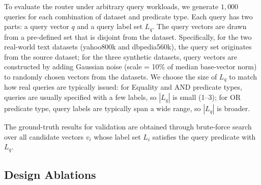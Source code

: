 To evaluate the router under arbitrary query workloads, we generate $1{,}000$ queries for each combination of dataset and predicate type. 
Each query has two parts: a query vector $q$ and a query label set $L_q$. The query vectors are drawn from a pre-defined set that is disjoint from the dataset. 
Specifically, for the two real-world text datasets (yahoo800k and dbpedia560k), the query set originates from the source dataset; for the three synthetic datasets, query vectors are constructed by adding Gaussian noise (scale = 10\% of median base-vector norm) to randomly chosen vectors from the datasets.
We choose the size of $L_q$ to match how real queries are typically issued: for Equality and AND predicate types, queries are usually specified with a few labels, so $|L_q|$ is small (1--3); for OR predicate type, query labels are typically span a wide range, so $|L_q|$ is broader.

The ground-truth results for validation
are obtained through brute-force search over all candidate vectors $v_i$ whose label set $L_i$ satisfies the query predicate with $L_q$.


\subsection{Design Ablations}
\label{sec:compared}


